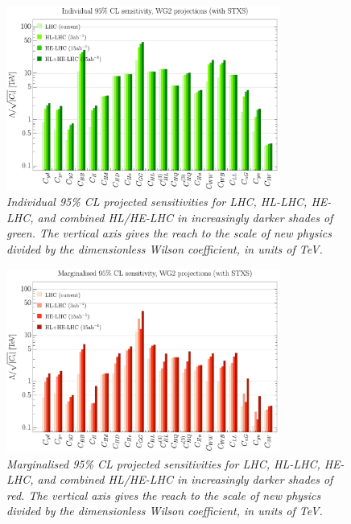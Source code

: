 \documentclass[../report.tex]{subfiles}
\begin{document}
\begin{figure}
  \centering
 \includegraphics[width=0.8\textwidth]{section8/plots/individualbarchart.pdf}
 \vspace{-0.2cm}
 \caption{\it Individual 95\% CL projected sensitivities for LHC, HL-LHC, HE-LHC, and combined HL/HE-LHC in increasingly darker shades of green. The vertical axis gives the reach to the scale of new physics divided by the dimensionless Wilson coefficient, in units of TeV. }
   \label{fig:indiv}
\end{figure} 

\begin{figure}
  \centering
 \includegraphics[width=0.8\textwidth]{section8/plots/marginalisedbarchart.pdf}
 \vspace{-0.2cm}
 \caption{\it  Marginalised 95\% CL projected sensitivities for LHC, HL-LHC, HE-LHC, and combined HL/HE-LHC in increasingly darker shades of red. The vertical axis gives the reach to the scale of new physics divided by the dimensionless Wilson coefficient, in units of TeV.}
   \label{fig:marg}
\end{figure} 
\end{document}
